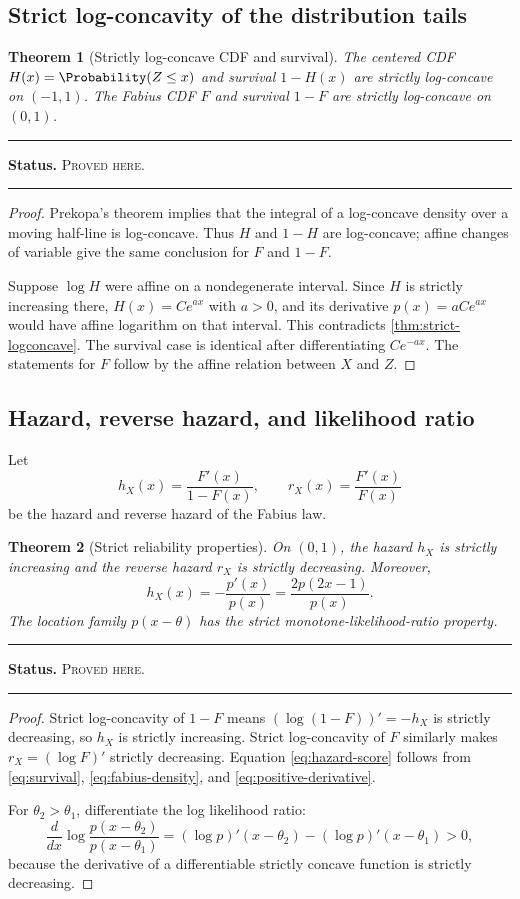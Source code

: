 \documentclass[11pt,oneside]{article}
\newtheorem{theorem}{Theorem}[section]
\theoremstyle{definition}
\theoremstyle{remark}
\newenvironment{boxedremark}{%
  \par\smallskip\noindent\begin{center}\begin{minipage}{0.94\textwidth}%
  \color{black}\hrule\vspace{0.6em}\small
}{%
  \vspace{0.6em}\hrule\end{minipage}\end{center}\smallskip
}
\newcommand{\ProvedHere}{\textsc{Proved here}}
\newcommand{\Status}[1]{%
  \begin{boxedremark}\textbf{Status.} #1.\end{boxedremark}}
\begin{document}
\subsection{Strict log-concavity of the distribution tails}
\begin{theorem}[Strictly log-concave CDF and survival]\label{thm:cdf-survival}
The centered CDF $H(x)=\Probability(Z\le x)$ and survival $1-H(x)$ are strictly
log-concave on $(-1,1)$.  The Fabius CDF $F$ and survival $1-F$ are strictly
log-concave on $(0,1)$.
\end{theorem}
\Status{\ProvedHere}

\begin{proof}
Prekopa's theorem implies that the integral of a log-concave density over a moving
half-line is log-concave.  Thus $H$ and $1-H$ are log-concave; affine changes of
variable give the same conclusion for $F$ and $1-F$.

Suppose $\log H$ were affine on a nondegenerate interval.  Since $H$ is strictly
increasing there, $H(x)=Ce^{ax}$ with $a>0$, and its derivative
$p(x)=aCe^{ax}$ would have affine logarithm on that interval.  This contradicts
\cref{thm:strict-logconcave}.  The survival case is identical after differentiating
$Ce^{-ax}$.  The statements for $F$ follow by the affine relation between $X$
and $Z$.
\end{proof}

\subsection{Hazard, reverse hazard, and likelihood ratio}
Let
\[
 h_X(x)=\frac{F'(x)}{1-F(x)},\qquad
 r_X(x)=\frac{F'(x)}{F(x)}
\]
be the hazard and reverse hazard of the Fabius law.

\begin{theorem}[Strict reliability properties]\label{thm:hazard}
On $(0,1)$, the hazard $h_X$ is strictly increasing and the reverse hazard
$r_X$ is strictly decreasing.  Moreover,
\begin{equation}\label{eq:hazard-score}
 h_X(x)=-\frac{p'(x)}{p(x)}
       =\frac{2p(2x-1)}{p(x)}.
\end{equation}
The location family $p(x-\theta)$ has the strict monotone-likelihood-ratio
property.
\end{theorem}
\Status{\ProvedHere}

\begin{proof}
Strict log-concavity of $1-F$ means $(\log(1-F))'=-h_X$ is strictly decreasing,
so $h_X$ is strictly increasing.  Strict log-concavity of $F$ similarly makes
$r_X=(\log F)'$ strictly decreasing.  Equation \eqref{eq:hazard-score} follows
from \eqref{eq:survival}, \eqref{eq:fabius-density}, and
\eqref{eq:positive-derivative}.

For $\theta_2>\theta_1$, differentiate the log likelihood ratio:
\[
 \frac{d}{dx}\log\frac{p(x-\theta_2)}{p(x-\theta_1)}
 = (\log p)'(x-\theta_2)-(\log p)'(x-\theta_1)>0,
\]
because the derivative of a differentiable strictly concave function is strictly
decreasing.
\end{proof}
\end{document}
